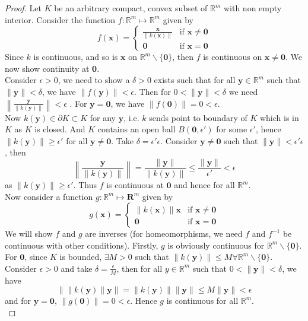 \documentclass{article}
\theoremstyle{definition}
\begin{document}
\begin{proof}
Let $K$ be an arbitrary compact, convex subset of $\mathbb{R}^m$ with non empty interior. Consider the function $f:\mathbb{R}^m\mapsto \mathbb{R}^m$ given by
\[
  f(\mathbf{x}) =
  \begin{cases}
  	\frac{\mathbf{x}}{\|k(\mathbf{x})\|} & \text{if } \mathbf{x}\neq \mathbf{0} \\
    \mathbf{0} & \text{if } \mathbf{x} = \mathbf{0}
  \end{cases}
\]
Since $k$ is continuous, and so is $\mathbf{x}$ on $\mathbb{R}^m\backslash \{\mathbf{0}\}$, then $f$ is continuous on $\mathbf{x}\neq \mathbf{0}$. We now show continuity at \textbf{0}.\\

Consider $\epsilon >0$, we need to show a $\delta>0$ exists such that for all $\mathbf{y}\in \mathbb{R}^m$ such that $\|\mathbf{y}\|<\delta$, we have $\|f(\mathbf{y})\|<\epsilon$. Then for $0 <\|\mathbf{y}\|<\delta$ we need $\displaystyle{\left\|\frac{\mathbf{y}}{\|k(\mathbf{y})\|}\right\|<\epsilon}$ . For $\mathbf{y} = \mathbf{0}$, we have $\|f(\mathbf{0})\| = 0 <\epsilon$.\\
Now $k(\mathbf{y}) \in \partial K \subset K$ for any $\mathbf{y}$, i.e. $k$ sends point to boundary of $K$ which is in $K$ as $K$ is closed. And $K$ contains an open ball $B(\mathbf{0},\epsilon')$ for some $\epsilon'$, hence $\|k(\mathbf{y})\| \geq \epsilon'$ for all $\mathbf{y}\neq \mathbf{0}$. Take $\delta = \epsilon' \epsilon$. Consider $\mathbf{y}\neq \mathbf{0}$ such that $\|\mathbf{y}\| <\epsilon'\epsilon$, then $$\left\|\frac{\mathbf{y}}{\|k(\mathbf{y})\|}\right\| = \frac{\|\mathbf{y}\|}{\|k(\mathbf{y})\|} \leq \frac{\|\mathbf{y}\|}{\epsilon'} < \epsilon$$ as $\|k(\mathbf{y})\| \geq \epsilon'$. Thus $f$ is continuous at $\mathbf{0}$ and hence for all $\mathbb{R}^m$.\\

Now consider a function $g:\mathbb{R}^m \mapsto \mathbf{R}^m$ given by 
\[
  g(\mathbf{x}) =
  \begin{cases}
  	\|k(\mathbf{x})\|\mathbf{x} & \text{if } \mathbf{x}\neq \mathbf{0} \\
    \mathbf{0} & \text{if } \mathbf{x} = \mathbf{0}
  \end{cases}
\]
We will show $f$ and $g$ are inverses (for homeomorphisms, we need $f$ and $f^{-1}$ be continuous with other conditions). Firstly, $g$ is obviously continuous for $\mathbb{R}^m\backslash \{\mathbf{0}\}$. For $\mathbf{0}$, since $K$ is bounded, $\exists M>0$ such that $\|k(\mathbf{y})\|\leq M \forall \mathbb{R}^m\backslash \{\mathbf{0}\}$. Consider $\epsilon>0$ and take $\delta = \frac{\epsilon}{M}$, then for all $y\in \mathbb{R}^m$ such that $0 <\|\mathbf{y}\|<\delta$, we have $$\|\|k(\mathbf{y})\| \mathbf{y}\| = \|k(\mathbf{y})\|\|\mathbf{y}\| \leq M\|\mathbf{y}\| <\epsilon$$ and for $\mathbf{y} = \mathbf{0}$, $\|g(\mathbf{0})\| = 0 <\epsilon$. Hence $g$ is continuous for all $\mathbb{R}^m$.\\


\end{proof}
\end{document}
